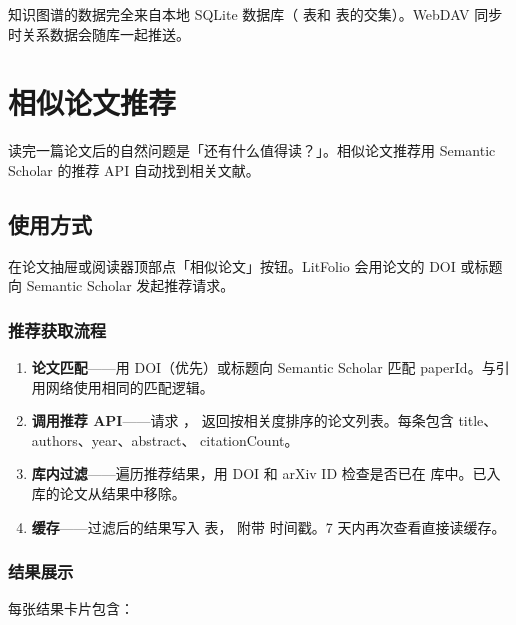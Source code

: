 \begin{tipbox}
知识图谱的数据完全来自本地 SQLite 数据库（ 表和
 表的交集）。WebDAV 同步时关系数据会随库一起推送。
\end{tipbox}

\chapter{相似论文推荐}
\label{ch:similar}

读完一篇论文后的自然问题是「还有什么值得读？」。相似论文推荐用 Semantic Scholar
的推荐 API 自动找到相关文献。

\section{使用方式}

在论文抽屉或阅读器顶部点「相似论文」按钮。LitFolio 会用论文的 DOI 或标题
向 Semantic Scholar 发起推荐请求。


\subsection{推荐获取流程}

\begin{enumerate}
  \item \textbf{论文匹配}——用 DOI（优先）或标题向 Semantic Scholar 匹配
    paperId。与引用网络使用相同的匹配逻辑。
  \item \textbf{调用推荐 API}——请求
    ，
    返回按相关度排序的论文列表。每条包含 title、authors、year、abstract、
    citationCount。
  \item \textbf{库内过滤}——遍历推荐结果，用 DOI 和 arXiv ID 检查是否已在
    库中。已入库的论文从结果中移除。
  \item \textbf{缓存}——过滤后的结果写入  表，
    附带  时间戳。7 天内再次查看直接读缓存。
\end{enumerate}

\subsection{结果展示}

每张结果卡片包含：

